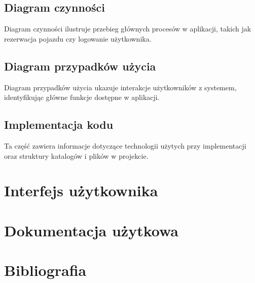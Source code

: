 \documentclass[12pt]{article}
\begin{document}
\subsection{Diagram czynności}
Diagram czynności ilustruje przebieg głównych procesów w aplikacji, takich jak rezerwacja pojazdu czy logowanie użytkownika.

\subsection{Diagram przypadków użycia}
Diagram przypadków użycia ukazuje interakcje użytkowników z systemem, identyfikując główne funkcje dostępne w aplikacji.

\subsection{Implementacja kodu}
Ta część zawiera informacje dotyczące technologii użytych przy implementacji oraz struktury katalogów i plików w projekcie.

\section{Interfejs użytkownika}
\section{Dokumentacja użytkowa}
\section{Bibliografia}
\end{document}
